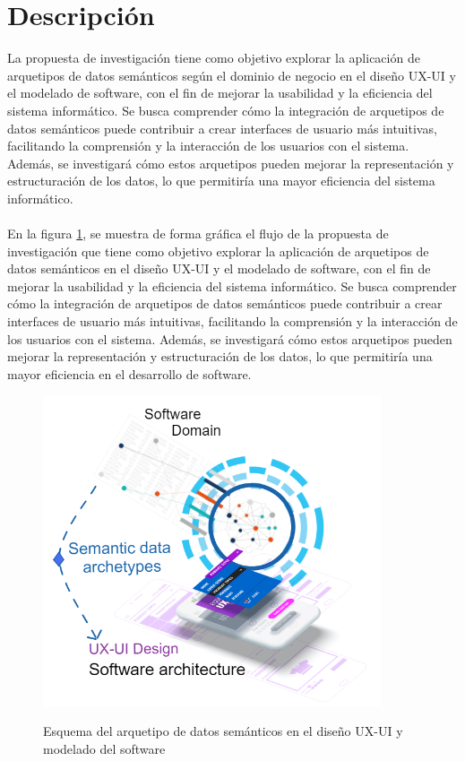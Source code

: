 \documentclass[12pt,a4paper]{article}
\begin{document}
\section{Descripción}
\label{sec:Description}
La propuesta de investigación tiene como objetivo explorar la aplicación de arquetipos de datos semánticos según el dominio de negocio en el diseño UX-UI y el modelado de software, con el fin de mejorar la usabilidad y la eficiencia del sistema informático. Se busca comprender cómo la integración de arquetipos de datos semánticos puede contribuir a crear interfaces de usuario más intuitivas, facilitando la comprensión y la interacción de los usuarios con el sistema. Además, se investigará cómo estos arquetipos pueden mejorar la representación y estructuración de los datos, lo que permitiría una mayor eficiencia del sistema informático. 
\\\\
En la figura \ref{fig:figDescripcion}, se muestra de forma gráfica el flujo de la propuesta de investigación que tiene como objetivo explorar la aplicación de arquetipos de datos semánticos en el diseño UX-UI y el modelado de software, con el fin de mejorar la usabilidad y la eficiencia del sistema informático. Se busca comprender cómo la integración de arquetipos de datos semánticos puede contribuir a crear interfaces de usuario más intuitivas, facilitando la comprensión y la interacción de los usuarios con el sistema. Además, se investigará cómo estos arquetipos pueden mejorar la representación y estructuración de los datos, lo que permitiría una mayor eficiencia en el desarrollo de software. 
\\
\begin{figure}[htb]
  \centering
  {\includegraphics[clip=true,trim= 0cm 0cm 0cm 0cm, width=10cm]{Figuras/figDescripcion.png}}
  \caption{Esquema del arquetipo de datos semánticos en el diseño UX-UI y modelado del software}
  \label{fig:figDescripcion}
\end{figure}
\end{document}
